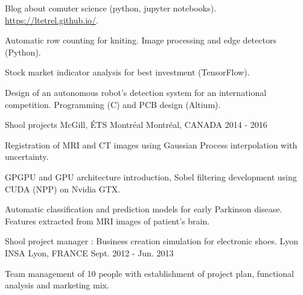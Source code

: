


\begin{cventries}


\cventry
{} %
{} %
{} %
{} %
{ %
\begin{cvitems}
\item {Blog about comuter science (python, jupyter notebooks). \url{https://ltetrel.github.io/}.}
\item {Automatic row counting for kniting. Image processing and edge detectors (Python).}
\item {Stock market indicator analysis for best investment (TensorFlow).}
\item {Design of an autonomous robot's detection system for an international competition. Programming (C) and PCB design (Altium).}
\end{cvitems}
}


\cventry
{Shool projects} %
{McGill, ÉTS Montréal} %
{Montréal, CANADA} %
{2014 - 2016} %
{ %
\begin{cvitems}
\item {Registration of MRI and CT images using Gaussian Process interpolation with uncertainty.}
\item {GPGPU and GPU architecture introduction, Sobel filtering development using CUDA (NPP) on Nvidia GTX.}
\item {Automatic classification and prediction models for early Parkinson disease. Features extracted from MRI images of patient's brain.}
\end{cvitems}
}


\cventry
{Shool project manager : Business creation simulation for electronic shoes.} %
{Lyon INSA} %
{Lyon, FRANCE} %
{Sept. 2012 - Jun. 2013} %
{ %
\begin{cvitems}
\item {Team management of 10 people with establishment of project plan, functional analysis and marketing mix.}
\end{cvitems}
}


\end{cventries}
